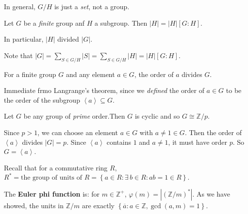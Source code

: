 \documentclass{notes}
\begin{document}
\begin{note}
  In general, $G / H$ is just a \textit{set}, not a group.
\end{note}

\begin{thm}
  Let $G$ be a \textit{finite} group anf $H$ a subgroup.
  Then $\left | H \right | = \left | H \right | [G : H]$.
  
  In particular, $\left | H \right |$ divided $\left | G \right |$.
\end{thm}

\begin{prf}
  Note that $\left | G \right | = \sum_{S \in G / H} \left | S \right | = \sum_{S \in G / H} \left | H \right | = \left | H \right | [G : H]$.
\end{prf}

\begin{cor}
  For a finite group $G$ and any element $a \in G$, the order of $a$ divides $G$.
\end{cor}

\begin{prf}
  Immediate frmo Langrange's theorem, since we \textit{defined} the order of $a \in G$ to be the order of the subgroup $\left \langle a \right \rangle \subseteq G$.
\end{prf}

\begin{cor}
  Let $G$ be any group of \textit{prime} order.Then $G$ is cyclic and so $G \cong \mathbb Z / p$.
\end{cor}

\begin{prf}
  Since $p > 1$, we can choose an element $a \in G$ with $a \neq 1 \in G$.
  Then the order of $\left \langle a \right \rangle$ divides $\left | G \right | = p$.
  Since $\left \langle a \right \rangle$ contains $1$ and $a \neq 1$, it must have order $p$.
  So $G = \left \langle a \right \rangle$.
\end{prf}

Recall that for a commutative ring $R$, $R^* = \text{the group of units of $R$} = \left \{ a \in R : \exists \, b \in R: a b = 1 \in R \right \}$.

\begin{defn}
  The {\boldmath \bfseries Euler phi function} is: for $m \in \mathbb Z^+$, $\varphi(m) = \left | (\mathbb Z / m)^* \right |$.
  As we have showed, the units in $\mathbb Z / m$ are exactly $\left \{ \overline a : a \in \mathbb Z, \gcd(a, m) = 1 \right \}$.
\end{defn}
\end{document}
